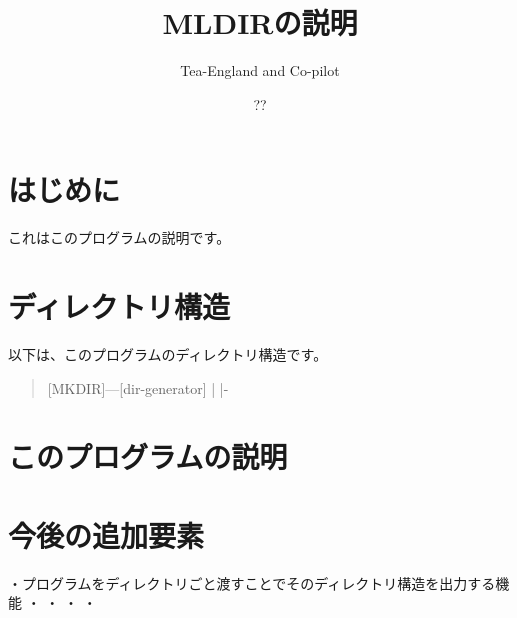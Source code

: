 \documentclass{article}
\title{MLDIRの説明}
\author{Tea-England and Co-pilot}
\date{??}
\begin{document}
\maketitle

\section{はじめに}
これはこのプログラムの説明です。

\section{ディレクトリ構造}
以下は、このプログラムのディレクトリ構造です。

\begin{verse}
[MKDIR]---[dir-generator]
      |            
      |-                 
                         
                           
                   
                  

\end{verse}
\section{このプログラムの説明}
\section{今後の追加要素}
・プログラムをディレクトリごと渡すことでそのディレクトリ構造を出力する機能
・
・
・
・
\end{document}
